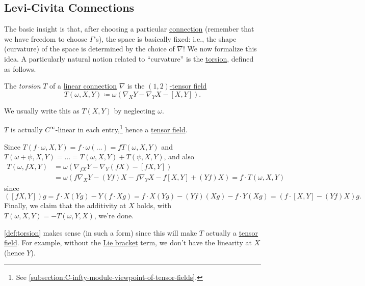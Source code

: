 \subsection{Levi-Civita Connections}
The basic insight is that, after choosing a particular \hyperref[def:linear-connection]{connection} (remember that we have freedom to choose \(\Gamma \)'s), the space is basically fixed: i.e., the shape (curvature) of the space is determined by the choice of \(\nabla \)! We now formalize this idea. A particularly natural notion related to ``curvature'' is the \hyperref[def:torsion]{torsion}, defined as follows.

\begin{definition}[Torsion]\label{def:torsion}
	The \emph{torsion} \(T\) of a \hyperref[def:linear-connection]{linear connection} \(\nabla \) is the \hyperref[def:tensor]{\((1, 2)\)-tensor field}
	\[
		T(\omega , X, Y) \coloneqq \omega \left( \nabla _X Y - \nabla _Y X - [X, Y] \right) .
	\]
\end{definition}

\begin{notation}
	We usually write this as \(T(X, Y)\) by neglecting \(\omega \).
\end{notation}

\begin{remark}
	\(T\) is actually \(C^{\infty} \)-linear in each entry,\footnote{See \autoref{subsection:C-infty-module-viewpoint-of-tensor-fields}.} hence a \hyperref[def:tensor-field]{tensor field}.
\end{remark}
\begin{explanation}
	Since \(T(f\cdot \omega , X, Y) = f\cdot \omega \left( \ldots \right) = f T(\omega , X, Y)\) and \(T(\omega + \psi , X, Y) = \ldots = T(\omega , X, Y) + T(\psi , X, Y)\), and also
	\[
		\begin{split}
			T(\omega , fX, Y) &= \omega \left( \nabla _{fX} Y - \nabla _Y(fX) - [fX, Y] \right) \\
			&= \omega (f \nabla _X Y - (Yf) X - f \nabla _Y X - f[X, Y] + (Yf)X)
			= f\cdot T(\omega , X, Y)
		\end{split}
	\]
	since
	\[
		([fX, Y])g = f\cdot X(Y g) - Y(f\cdot Xg)
		= f\cdot X(Yg) - (Yf) (Xg) - f\cdot Y(Xg)
		= \left( f\cdot [X, Y] - (Yf)X \right) g.
	\]
	Finally, we claim that the additivity at \(X\) holds, with \(T(\omega , X, Y) = -T(\omega , Y, X)\), we're done.
\end{explanation}

\begin{intuition}
	\autoref{def:torsion} makes sense (in such a form) since this will make \(T\) actually a \hyperref[def:tensor-field]{tensor field}. For example, without the \hyperref[def:bracket]{Lie bracket} term, we don't have the linearity at \(X\) (hence \(Y\)).
\end{intuition}

